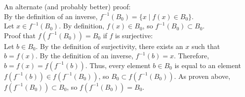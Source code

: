 \documentclass{article}
\begin{document}
\begin{enumerate}
\begin{enumerate}
                        An alternate (and probably better) proof:\\
                        By the definition of an inverse, $f^{-1}(B_{0}) = \{x \mid f(x) \in B_{0}\}$.\\
                        Let $x \in f^{-1}(B_{0})$. By definition, $f(x) \in B_{0}$, so $f^{-1}(B_{0}) \subset B_{0}$.\\

                        Proof that $f(f^{-1}(B_{0})) = B_{0}$ if $f$ is surjective:\\
                        Let $b \in B_{0}$. By the definition of surjectivity, there exists an $x$ such that $b = f(x)$. By the definition of an inverse, $f^{-1}(b) = x$. Therefore, $b = f(x) = f(f^{-1}(b))$. Thus, every element $b \in B_{0}$ is equal to an element $f(f^{-1}(b)) \in f(f^{-1}(B_{0}))$, so $B_{0} \subset f(f^{-1}(B_{0}))$. As proven above, $f(f^{-1}(B_{0})) \subset B_{0}$, so $f(f^{-1}(B_{0})) = B_{0}$.


\end{enumerate}
\end{enumerate}
\end{document}
